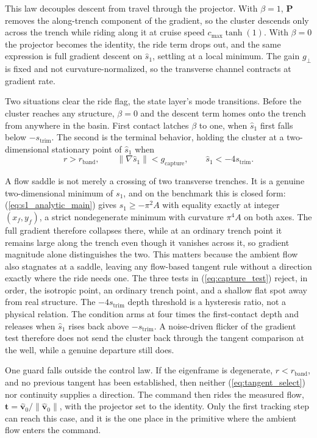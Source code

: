 \documentclass[lettersize,journal]{IEEEtran}
\begin{document}
This law decouples descent from travel through the projector.
With $\beta = 1$, $\mathbf{P}$ removes the along-trench component of the
gradient, so the cluster descends only across the trench while riding
along it at cruise speed $c_{\max}\tanh(1)$. With $\beta = 0$ the
projector becomes the identity, the ride term drops out, and the same
expression is full gradient descent on $\hat{s}_1$, settling at a
local minimum. The gain $g_\perp$ is fixed and not
curvature-normalized, so the transverse channel contracts at gradient
rate.

Two situations clear the ride flag, the state layer's mode
transitions. Before the cluster reaches any structure, $\beta = 0$
and the descent term homes onto the trench from anywhere in the basin.
First contact latches $\beta$ to one, when $\hat{s}_1$
first falls below $-s_{\mathrm{trim}}$. The second is the
terminal behavior, holding the cluster at a two-dimensional
stationary point of $\hat{s}_1$ when
\begin{equation}
    r > r_{\mathrm{band}}, \qquad
    \lVert\nabla\hat{s}_1\rVert < g_{\mathrm{capture}}, \qquad
    \hat{s}_1 < -4 s_{\mathrm{trim}}.
    \label{eq:capture_test}
\end{equation}

A flow saddle is not merely a crossing of two transverse trenches. It is
a genuine two-dimensional minimum of $s_1$, and on the benchmark this
is closed form: (\ref{eq:s1_analytic_main}) gives
$s_1 \geq -\pi^2 A$ with equality exactly at integer $(x_f, y_f)$, a
strict nondegenerate minimum with curvature $\pi^4 A$ on both axes. The
full gradient therefore collapses there, while at an
ordinary trench point it remains large along the trench even
though it vanishes across it, so gradient magnitude alone distinguishes
the two. This matters because the ambient flow also stagnates at a
saddle, leaving any flow-based tangent rule without a direction exactly
where the ride needs one.
The three tests in (\ref{eq:capture_test}) reject, in order, the
isotropic point, an ordinary trench point, and a shallow flat spot away
from real structure. The $-4s_{\mathrm{trim}}$ depth
threshold is a hysteresis ratio, not a physical relation. The condition arms at four times the first-contact depth and releases when $\hat{s}_1$ rises back above $-s_{\mathrm{trim}}$. A noise-driven flicker of the gradient test therefore does not send the cluster back through the tangent comparison at the well, while a genuine departure still does.

One guard falls outside the control law. If the eigenframe is
degenerate, $r < r_{\mathrm{band}}$, and no previous tangent has been
established, then neither (\ref{eq:tangent_select}) nor continuity
supplies a direction. The command then rides the measured flow,
$\mathbf{t} = \hat{\mathbf{v}}_0/\|\hat{\mathbf{v}}_0\|$, with the
projector set to the identity. Only the first tracking step can reach
this case, and it is the one place in the primitive where the ambient
flow enters the command.
\end{document}
